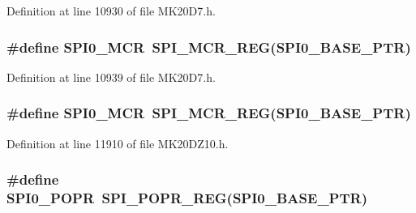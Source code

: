 Definition at line 10930 of file M\+K20\+D7.\+h.

\subsubsection[{\texorpdfstring{S\+P\+I0\+\_\+\+M\+CR}{SPI0_MCR}}]{\setlength{\rightskip}{0pt plus 5cm}\#define S\+P\+I0\+\_\+\+M\+CR~{\bf S\+P\+I\+\_\+\+M\+C\+R\+\_\+\+R\+EG}({\bf S\+P\+I0\+\_\+\+B\+A\+S\+E\+\_\+\+P\+TR})}\hypertarget{group___s_p_i___register___accessor___macros_gaad4d9e80de527e18ba0e9d5d2bb296f1}{}\label{group___s_p_i___register___accessor___macros_gaad4d9e80de527e18ba0e9d5d2bb296f1}


Definition at line 10939 of file M\+K20\+D7.\+h.

\subsubsection[{\texorpdfstring{S\+P\+I0\+\_\+\+M\+CR}{SPI0_MCR}}]{\setlength{\rightskip}{0pt plus 5cm}\#define S\+P\+I0\+\_\+\+M\+CR~{\bf S\+P\+I\+\_\+\+M\+C\+R\+\_\+\+R\+EG}({\bf S\+P\+I0\+\_\+\+B\+A\+S\+E\+\_\+\+P\+TR})}\hypertarget{group___s_p_i___register___accessor___macros_gaad4d9e80de527e18ba0e9d5d2bb296f1}{}\label{group___s_p_i___register___accessor___macros_gaad4d9e80de527e18ba0e9d5d2bb296f1}


Definition at line 11910 of file M\+K20\+D\+Z10.\+h.

\subsubsection[{\texorpdfstring{S\+P\+I0\+\_\+\+P\+O\+PR}{SPI0_POPR}}]{\setlength{\rightskip}{0pt plus 5cm}\#define S\+P\+I0\+\_\+\+P\+O\+PR~{\bf S\+P\+I\+\_\+\+P\+O\+P\+R\+\_\+\+R\+EG}({\bf S\+P\+I0\+\_\+\+B\+A\+S\+E\+\_\+\+P\+TR})}\hypertarget{group___s_p_i___register___accessor___macros_ga71790353458ed0d939a04f5c0342a46c}{}\label{group___s_p_i___register___accessor___macros_ga71790353458ed0d939a04f5c0342a46c}


